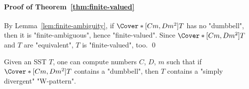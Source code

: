 \documentclass{theoretics}
\begin{document}
\paragraph{Proof of Theorem~\ref{thm:finite-valued}}
By Lemma~\ref{lem:finite-ambiguity}, 
if $\Cover*[Cm,Dm^2]{T}$ has no "dumbbell",
then it is "finite-ambiguous", hence %
"finite-valued".
Since $\Cover*[Cm,Dm^2]{T}$  and $T$ are "equivalent",
$T$ is "finite-valued", too.
\qed


\begin{lemma}\label{lem:unbounded-values3}
Given an SST $T$, one can compute  numbers $C$, $D$, $m$ such that
if $\Cover*[Cm,Dm^2]{T}$ contains a "dumbbell", then $T$ contains a 
"simply divergent" "W-pattern".
\end{lemma}
\end{document}
